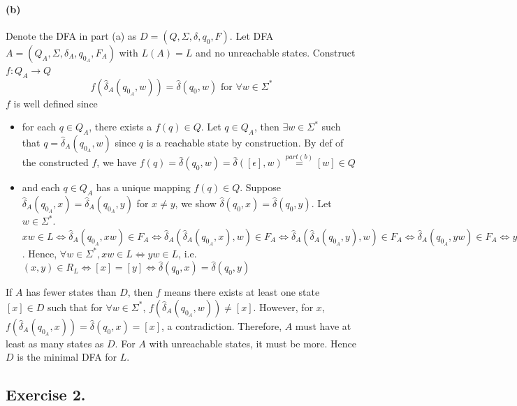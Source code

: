 \documentclass[12pt]{article}
\begin{document}
\paragraph*{(b)} Denote the DFA in part (a) as \(D = (Q, \Sigma, \delta, q_{0}, F)\). Let DFA \(A = (Q_{A}, \Sigma, \delta_{A}, q_{0_{A}}, F_{A})\) with \(L(A) = L\) and no unreachable states. Construct \(f : Q_A \to Q\)
\begin{equation*}
  f(\hat{\delta}_A(q_{0_{A}}, w)) = \hat{\delta}(q_0, w) \text{ for } \forall w \in \Sigma^*
\end{equation*}
\(f\) is well defined since
\begin{itemize}
  \item for each \(q \in Q_{A}\), there exists a \(f(q) \in Q\). Let \(q \in Q_A\), then \(\exists w \in \Sigma^*\) such that \(q = \hat{\delta}_A(q_{0_{A}}, w)\) since \(q\) is a reachable state by construction. By def of the constructed \(f\), we have \(f(q) = \hat{\delta}(q_0, w) = \hat{\delta}([\epsilon], w) \overset{part (b)}{=} [w] \in Q\)
  \item and each \(q \in Q_{A}\) has a unique mapping \(f(q) \in Q\). Suppose \(\hat{\delta}_A(q_{0_{A}}, x) = \hat{\delta}_A(q_{0_{A}}, y)\) for \(x \neq y\), we show \(\hat{\delta}(q_0, x) = \hat{\delta}(q_0, y)\). Let \(w \in \Sigma^*\). \(xw \in L \Leftrightarrow \hat{\delta}_A(q_{0_{A}}, xw) \in F_A \Leftrightarrow \hat{\delta}_A(\hat{\delta}_A(q_{0_{A}}, x), w) \in F_A \Leftrightarrow \hat{\delta}_A(\hat{\delta}_A(q_{0_{A}}, y), w) \in F_A \Leftrightarrow \hat{\delta}_A(q_{0_{A}}, yw) \in F_A \Leftrightarrow yw \in L\). Hence, \(\forall w \in \Sigma^*, xw \in L \Leftrightarrow yw \in L\), i.e. \((x,y) \in R_L \Leftrightarrow [x] = [y] \Leftrightarrow \hat{\delta}(q_0, x) = \hat{\delta}(q_0, y)\)
\end{itemize}
If \(A\) has fewer states than \(D\), then \(f\) means there exists at least one state \([x] \in D\) such that for \(\forall w \in \Sigma^*\), \(f(\hat{\delta}_A(q_{0_{A}}, w)) \neq [x]\). However, for \(x\), \(f(\hat{\delta}_A(q_{0_{A}}, x)) = \hat{\delta}(q_0, x) = [x]\), a contradiction. Therefore, \(A\) must have at least as many states as \(D\). For \(A\) with unreachable states, it must be more. Hence \(D\) is the minimal DFA for \(L\).

\subsection*{Exercise 2.} 
\end{document}
